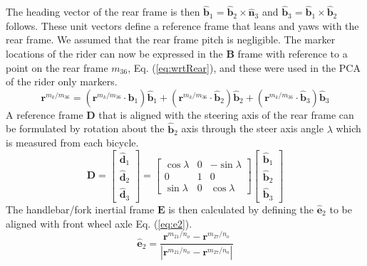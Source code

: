The heading vector of the rear frame is then $\hat{\mathbf{b}}_1=\hat{\mathbf{b}}_2\times\hat{\mathbf{n}}_3$ and $\hat{\mathbf{b}}_3=\hat{\mathbf{b}}_1\times\hat{\mathbf{b}}_2$ follows. These unit vectors define a reference frame that leans and yaws with the rear frame. We assumed that the rear frame pitch is negligible. The marker locations of the rider can now be expressed in the $\mathbf{B}$ frame with reference to a point on the rear frame $m_{36}$, Eq. (\ref{eq:wrtRear}), and these were used in the PCA of the rider only markers.
\begin{equation}
    \mathbf{r}^{{m_{k}}/m_{36}}=
    (\mathbf{r}^{{m_{k}}/m_{36}}\cdot\hat{\mathbf{b}}_1)\hat{\mathbf{b}}_1+
    (\mathbf{r}^{{m_{k}}/m_{36}}\cdot\hat{\mathbf{b}}_2)\hat{\mathbf{b}}_2+
    (\mathbf{r}^{{m_{k}}/m_{36}}\cdot\hat{\mathbf{b}}_3)\hat{\mathbf{b}}_3
\label{eq:wrtRear}
\end{equation}
A reference frame $\mathbf{D}$ that is aligned with the steering axis of the rear frame can be formulated by rotation about the $\hat{\mathbf{b}}_2$ axis through the steer axis angle $\lambda$ which is measured from each bicycle.
\begin{equation}
    \mathbf{D}=
    \left[
    \begin{array}{c}
    \hat{\mathbf{d}}_1\\
    \hat{\mathbf{d}}_2\\
    \hat{\mathbf{d}}_3
  \end{array}
    \right]
    =
    \left[
    \begin{array}{rrr}
    \cos{\lambda} &  0 &  -\sin{\lambda}\\
    0             &  1 &  0\\
    \sin{\lambda} &  0 & \cos{\lambda}
    \end{array}
    \right]
    \left[
    \begin{array}{c}
    \hat{\mathbf{b}}_1\\
    \hat{\mathbf{b}}_2\\
    \hat{\mathbf{b}}_3
  \end{array}
    \right]
\label{eq:Dframe}
\end{equation}
The handlebar/fork inertial frame $\mathbf{E}$ is then calculated by defining the $\hat{\mathbf{e}}_2$ to be aligned with front wheel axle Eq. (\ref{eq:e2}).
\begin{equation}
    \hat{\mathbf{e}}_2=\frac{\mathbf{r}^{{m_{21}}/{n_o}}-\mathbf{r}^{{m_{27}}/{n_o}}}
                            {|\mathbf{r}^{{m_{21}}/{n_o}}-\mathbf{r}^{{m_{27}}/{n_o}}|}
\label{eq:e2}
\end{equation}
